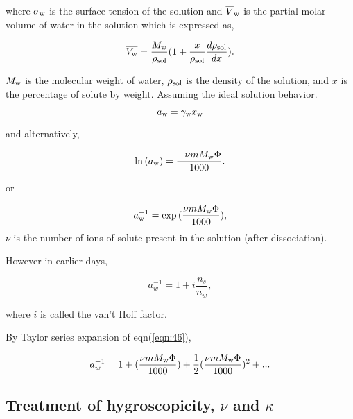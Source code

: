 \documentclass[12pt]{article}
\begin{document}
{where $\sigma_{\rm w}$ is the surface tension of the solution and $\overline V_{\rm w}$ is the partial molar volume of water in the solution which is expressed as, 

\begin{equation}
\overline{V_{\rm w}}=\frac{ M_{\rm w}}{\rho_{\rm sol}} (1 + \frac{x}{\rho_{\rm sol}} \frac{d \rho_{\rm sol}}{dx}).
\end{equation}

$M_{\rm w}$ is the molecular weight of water, $\rho_{\rm sol}$ is the density of the solution, and $x$ is the percentage of solute by weight. Assuming the ideal solution behavior.

\begin{equation}
a_{\rm w}=\gamma_{\rm w} x_{\rm w}
\end{equation}

and alternatively, 

\begin{equation}
\ln {(a_{\rm w})}=\frac{- \nu m M_{\rm w} \Phi }{1000}.
\end{equation}

or 

\begin{equation}\label{eqn:46}
a_{\rm w}^{-1}=\exp{(\frac{\nu m M_{\rm w} \Phi }{1000})},
\end{equation}
$\nu$ is the number of ions of solute present in the solution (after dissociation). 

However in earlier days, 

\begin{equation}
a_{w}^{-1}=1+i \frac{n_{s}}{n_{w}},
\end{equation}

where $i$ is called the van't Hoff factor.

By Taylor series expansion of eqn(\ref{eqn:46}), 

\begin{equation}
a_{w}^{-1}=1+(\frac{\nu m M_{\rm w} \Phi }{1000})+\frac{1}{2}(\frac{\nu m M_{\rm w} \Phi }{1000})^{2}+...
\end{equation}


\subsection{Treatment of hygroscopicity, $\nu$ and $\kappa$}  
 
\begin{itemize}


\end{itemize}}
\end{document}
